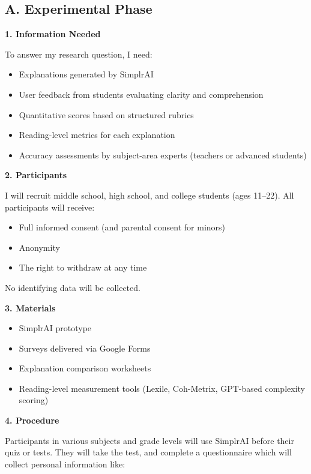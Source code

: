 \documentclass[11pt]{article}
\begin{document}
\subsection*{A. Experimental Phase}

\textbf{1. Information Needed}

To answer my research question, I need:

\begin{itemize}[leftmargin=1.6em]
  \item Explanations generated by SimplrAI
  \item User feedback from students evaluating clarity and comprehension
  \item Quantitative scores based on structured rubrics
  \item Reading-level metrics for each explanation
  \item Accuracy assessments by subject-area experts (teachers or advanced
  students)
\end{itemize}

\textbf{2. Participants}

I will recruit middle school, high school, and college students (ages 11--22).
All participants will receive:

\begin{itemize}[leftmargin=1.6em]
  \item Full informed consent (and parental consent for minors)
  \item Anonymity
  \item The right to withdraw at any time
\end{itemize}

No identifying data will be collected.

\textbf{3. Materials}

\begin{itemize}[leftmargin=1.6em]
  \item SimplrAI prototype
  \item Surveys delivered via Google Forms
  \item Explanation comparison worksheets
  \item Reading-level measurement tools (Lexile, Coh-Metrix, GPT-based
  complexity scoring)
\end{itemize}

\textbf{4. Procedure}

Participants in various subjects and grade levels will use SimplrAI before their
quiz or tests. They will take the test, and complete a questionnaire which will
collect personal information like:
\end{document}
